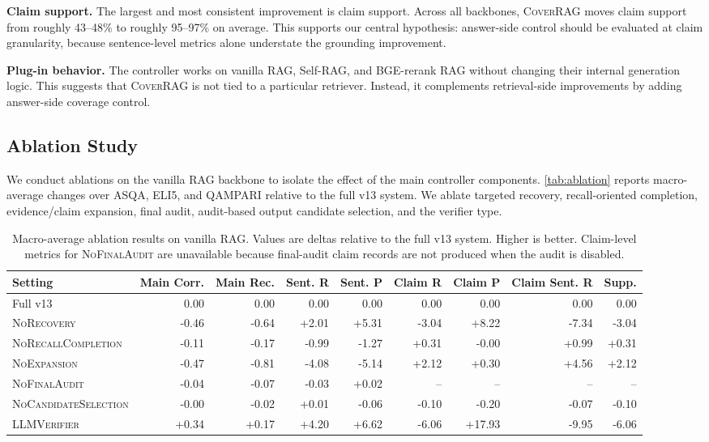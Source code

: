 \textbf{Claim support.} The largest and most consistent improvement is claim support. Across all backbones, \textsc{CoverRAG} moves claim support from roughly 43--48\% to roughly 95--97\% on average. This supports our central hypothesis: answer-side control should be evaluated at claim granularity, because sentence-level metrics alone understate the grounding improvement.

\textbf{Plug-in behavior.} The controller works on vanilla RAG, Self-RAG, and BGE-rerank RAG without changing their internal generation logic. This suggests that \textsc{CoverRAG} is not tied to a particular retriever. Instead, it complements retrieval-side improvements by adding answer-side coverage control.

\subsection{Ablation Study}

We conduct ablations on the vanilla RAG backbone to isolate the effect of the main controller components. \autoref{tab:ablation} reports macro-average changes over ASQA, ELI5, and QAMPARI relative to the full v13 system. We ablate targeted recovery, recall-oriented completion, evidence/claim expansion, final audit, audit-based output candidate selection, and the verifier type.

\begin{table}[t]
    \centering
    \caption{Macro-average ablation results on vanilla RAG. Values are deltas relative to the full v13 system. Higher is better. Claim-level metrics for \textsc{NoFinalAudit} are unavailable because final-audit claim records are not produced when the audit is disabled.}
    \label{tab:ablation}
    \scriptsize
    \setlength{\tabcolsep}{3pt}
    \begin{tabular}{lrrrrrrrr}
        \toprule
        Setting & Main Corr. & Main Rec. & Sent. R & Sent. P & Claim R & Claim P & Claim Sent. R & Supp. \\
        \midrule
        Full v13 & 0.00 & 0.00 & 0.00 & 0.00 & 0.00 & 0.00 & 0.00 & 0.00 \\
        \textsc{NoRecovery} & -0.46 & -0.64 & +2.01 & +5.31 & -3.04 & +8.22 & -7.34 & -3.04 \\
        \textsc{NoRecallCompletion} & -0.11 & -0.17 & -0.99 & -1.27 & +0.31 & -0.00 & +0.99 & +0.31 \\
        \textsc{NoExpansion} & -0.47 & -0.81 & -4.08 & -5.14 & +2.12 & +0.30 & +4.56 & +2.12 \\
        \textsc{NoFinalAudit} & -0.04 & -0.07 & -0.03 & +0.02 & -- & -- & -- & -- \\
        \textsc{NoCandidateSelection} & -0.00 & -0.02 & +0.01 & -0.06 & -0.10 & -0.20 & -0.07 & -0.10 \\
        \textsc{LLMVerifier} & +0.34 & +0.17 & +4.20 & +6.62 & -6.06 & +17.93 & -9.95 & -6.06 \\
        \bottomrule
    \end{tabular}
\end{table}

